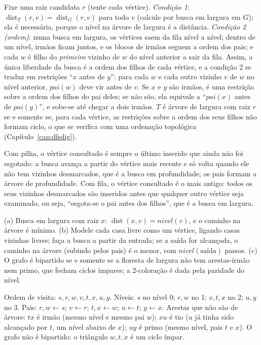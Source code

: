  Fixe uma raiz candidata $r$ (tente cada vértice). \emph{Condição 1}: $\operatorname{dist}_T(r,v)=\operatorname{dist}_G(r,v)$ para todo $v$ (calcule por busca em largura em $G$); ela é necessária, porque o nível na árvore de largura é a distância. \emph{Condição 2 (ordem)}: numa busca em largura, os vértices saem da fila nível a nível; dentro de um nível, irmãos ficam juntos, e os blocos de irmãos seguem a ordem dos pais; e cada $w$ é filho do \emph{primeiro} vizinho de $w$ do nível anterior a sair da fila. Assim, a única liberdade da busca é a ordem dos filhos de cada vértice, e a condição 2 se traduz em restrições ``$x$ antes de $y$'': para cada $w$ e cada outro vizinho $v$ de $w$ no nível anterior, $pai(w)$ deve vir antes de $v$. Se $x$ e $y$ são irmãos, é uma restrição sobre a ordem dos filhos do pai deles; se não são, ela equivale a ``$pai(x)$ antes de $pai(y)$'', e sobe-se até chegar a dois irmãos. $T$ é árvore de largura com raiz $r$ se e somente se, para cada vértice, as restrições sobre a ordem dos seus filhos não formam ciclo, o que se verifica com uma ordenação topológica (Capítulo~\ref{cap:dfsdig}).

 Com pilha, o vértice consultado é sempre o último inserido que ainda não foi esgotado: a busca avança a partir do vértice mais recente e só volta quando ele não tem vizinhos desmarcados, que é a busca em profundidade; os pais formam a árvore de profundidade. Com fila, o vértice consultado é o mais antigo: todos os seus vizinhos desmarcados são inseridos antes que qualquer outro vértice seja examinado, ou seja, ``esgota-se o pai antes dos filhos'', que é a busca em largura.

 (a) Busca em largura com raiz $x$: $\operatorname{dist}(x,v)=nivel(v)$, e o caminho na árvore é mínimo. (b) Modele cada casa livre como um vértice, ligando casas vizinhas livres; faça a busca a partir da entrada; se a saída for alcançada, o caminho na árvore (subindo pelos pais) é o menor, com $nivel(\text{saída})$ passos. (c) O grafo é bipartido se e somente se a floresta de largura não tem arestas-irmão nem primo, que fecham ciclos ímpares; a 2-coloração é dada pela paridade do nível.

 Ordem de visita: $s,r,w,v,t,x,u,y$. Níveis: $s$ no nível 0; $r,w$ no 1; $v,t,x$ no 2; $u,y$ no 3. Pais: $r,w\leftarrow s$; $v\leftarrow r$; $t,x\leftarrow w$; $u\leftarrow t$; $y\leftarrow x$. Arestas que não são de árvore: $tx$ é irmão (mesmo nível e mesmo pai $w$); $xu$ é tio ($u$ já tinha sido alcançado por $t$, um nível abaixo de $x$); $uy$ é primo (mesmo nível, pais $t$ e $x$). O grafo não é bipartido: o triângulo $w,t,x$ é um ciclo ímpar.


